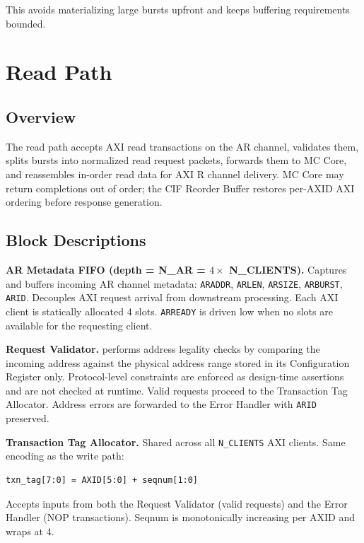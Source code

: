 This avoids materializing large bursts upfront and keeps buffering requirements bounded.

\section{Read Path}

\subsection{Overview}

The read path accepts AXI read transactions on the AR channel, validates them, splits bursts into normalized read request packets, forwards them to MC Core, and reassembles in-order read data for AXI R channel delivery. MC Core may return completions out of order; the CIF Reorder Buffer restores per-AXID AXI ordering before response generation.

\subsection{Block Descriptions}

\textbf{AR Metadata FIFO (depth = N\_AR = $4 \times$ N\_CLIENTS).}
Captures and buffers incoming AR channel metadata: \texttt{ARADDR}, \texttt{ARLEN}, \texttt{ARSIZE}, \texttt{ARBURST}, \texttt{ARID}. Decouples AXI request arrival from downstream processing. Each AXI client is statically allocated 4 slots. \texttt{ARREADY} is driven low when no slots are available for the requesting client.

\textbf{Request Validator.}
performs address legality checks by comparing the incoming address against the physical address range stored in its Configuration Register only. Protocol-level constraints are enforced as design-time assertions and are not checked at runtime. Valid requests proceed to the Transaction Tag Allocator. Address errors are forwarded to the Error Handler with \texttt{ARID} preserved.

\textbf{Transaction Tag Allocator.}
Shared across all \texttt{N\_CLIENTS} AXI clients. Same encoding as the write path:
\begin{lstlisting}
txn_tag[7:0] = AXID[5:0] + seqnum[1:0]
\end{lstlisting}
Accepts inputs from both the Request Validator (valid requests) and the Error Handler (NOP transactions). Seqnum is monotonically increasing per AXID and wraps at 4.

